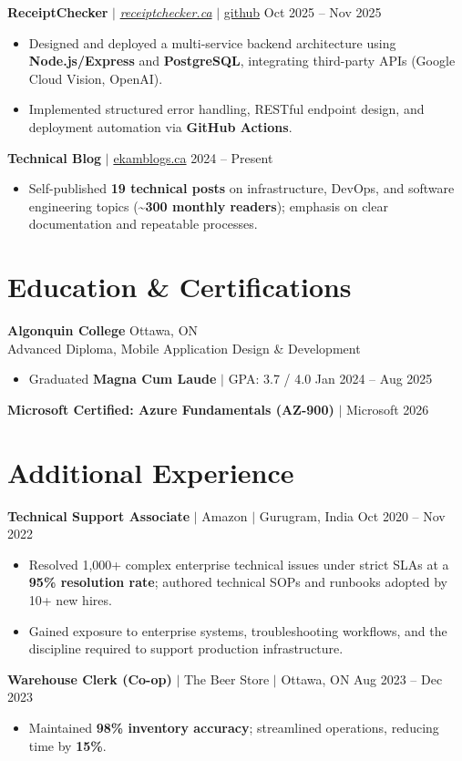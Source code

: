 \documentclass[11pt,a4paper]{article}
\begin{document}
\vspace{4pt}

\textbf{ReceiptChecker} $|$ \href{https://receiptchecker.ca/}{\emph{receiptchecker.ca}} $|$ \href{https://github.com/bhat0155/receipt-check}{\small github} \hfill Oct 2025 -- Nov 2025
\begin{itemize}
    \item Designed and deployed a multi-service backend architecture using \textbf{Node.js/Express} and \textbf{PostgreSQL}, integrating third-party APIs (Google Cloud Vision, OpenAI).
    \item Implemented structured error handling, RESTful endpoint design, and deployment automation via \textbf{GitHub Actions}.
\end{itemize}

\vspace{4pt}

\textbf{Technical Blog} $|$ \href{https://www.ekamblogs.ca}{ekamblogs.ca} \hfill 2024 -- Present
\begin{itemize}
    \item Self-published \textbf{19 technical posts} on infrastructure, DevOps, and software engineering topics (\textasciitilde\textbf{300 monthly readers}); emphasis on clear documentation and repeatable processes.
\end{itemize}

\section{Education \& Certifications}

\textbf{Algonquin College} \hfill Ottawa, ON \\
Advanced Diploma, Mobile Application Design \& Development
\begin{itemize}
    \item Graduated \textbf{Magna Cum Laude} $|$ GPA: 3.7 / 4.0 \hfill Jan 2024 -- Aug 2025
\end{itemize}
\textbf{Microsoft Certified: Azure Fundamentals (AZ-900)} $|$ Microsoft \hfill 2026

\section{Additional Experience}

\textbf{Technical Support Associate} $|$ Amazon $|$ Gurugram, India \hfill Oct 2020 -- Nov 2022
\begin{itemize}
    \item Resolved 1,000+ complex enterprise technical issues under strict SLAs at a \textbf{95\% resolution rate}; authored technical SOPs and runbooks adopted by 10+ new hires.
    \item Gained exposure to enterprise systems, troubleshooting workflows, and the discipline required to support production infrastructure.
\end{itemize}

\vspace{4pt}

\textbf{Warehouse Clerk (Co-op)} $|$ The Beer Store $|$ Ottawa, ON \hfill Aug 2023 -- Dec 2023
\begin{itemize}
    \item Maintained \textbf{98\% inventory accuracy}; streamlined operations, reducing time by \textbf{15\%}.
\end{itemize}
\end{document}
